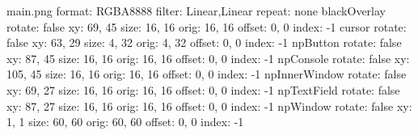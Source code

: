 
main.png
format: RGBA8888
filter: Linear,Linear
repeat: none
blackOverlay
  rotate: false
  xy: 69, 45
  size: 16, 16
  orig: 16, 16
  offset: 0, 0
  index: -1
cursor
  rotate: false
  xy: 63, 29
  size: 4, 32
  orig: 4, 32
  offset: 0, 0
  index: -1
npButton
  rotate: false
  xy: 87, 45
  size: 16, 16
  orig: 16, 16
  offset: 0, 0
  index: -1
npConsole
  rotate: false
  xy: 105, 45
  size: 16, 16
  orig: 16, 16
  offset: 0, 0
  index: -1
npInnerWindow
  rotate: false
  xy: 69, 27
  size: 16, 16
  orig: 16, 16
  offset: 0, 0
  index: -1
npTextField
  rotate: false
  xy: 87, 27
  size: 16, 16
  orig: 16, 16
  offset: 0, 0
  index: -1
npWindow
  rotate: false
  xy: 1, 1
  size: 60, 60
  orig: 60, 60
  offset: 0, 0
  index: -1
